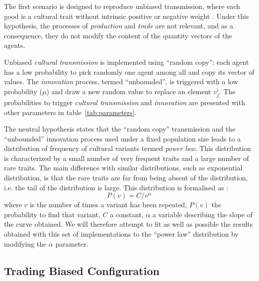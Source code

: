 \documentclass{wscpaperproc}
\begin{document}
The first scenario is designed to reproduce unbiased transmission, where each good is a cultural trait without intrinsic positive or negative weight \cite{bentley_random_2004,bentley_specialisation_2005,mesoudi_random_2009}. 
Under this hypothesis, the processes of \emph{production} and \emph{trade} are not relevant, and as a consequence, they do not modify the content of the quantity vectors of the agents.

Unbiased \emph{cultural transmission} is implemented using ``random copy'': each agent has a low probability to pick randomly one agent among all and copy its vector of values. The \emph{innovation} process, termed ``unbounded'', is triggered with a low probability ($\mu$) and draw a new random value to replace an element $v^i_j$. The probabilities to trigger \emph{cultural transmission} and \emph{innovation} are presented with other parameters in table~\ref{tab:parameters}.

The neutral hypothesis states that the ``random copy'' transmission and the ``unbounded'' innovation process used under a fixed population size leads to a distribution of frequency of cultural variants termed \emph{power law}. This distribution is characterized by a small number of very frequent traits and a large number of rare traits. The main difference with similar distributions, such as exponential distribution, is that the rare traits are far from being absent of the distribution, i.e. the tail of the distribution is large.
This distribution is formalised as : $$P(v)=C/v^\alpha $$ where $v$ is the number of times a variant has been repeated, $P(v)$ the probability to find that variant, $C$ a constant, $\alpha$ a variable describing the slope of the curve obtained. We will therefore attempt to fit as well as possible the results obtained with this set of implementations to the ``power law'' distribution by modifying the $\alpha$ parameter.

\subsection{Trading Biased Configuration}\label{sec:trade}
\end{document}
